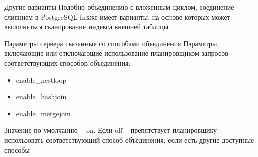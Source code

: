 \documentclass[12pt]{article}
\begin{document}
\begin{Remark}{Другие варианты}
    Подобно объединению с вложенным циклом, соединение слиянием в PostgreSQL fnкже имеет варианты, на основе которых может выполняться сканирование индекса внешней таблицы 
\end{Remark}

\begin{nota}{Параметры сервера связанные со способами объединения}
    Параметры, включающие или отключающие использование планировщиком запросов соответствующих способов объединения:

    \begin{itemize}
        \item enable\_nestloop
        \item enable\_hashjoin
        \item enable\_mergejoin
    \end{itemize}

    Значение по умолчанию -- on. Если off -- препятствует планировщику использовать соответствующий способ объединения, если есть другие доступные способы
\end{nota}
\end{document}

